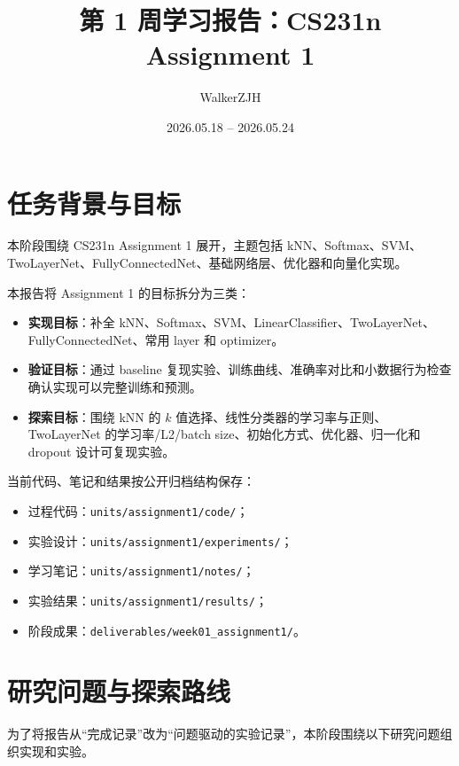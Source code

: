 \documentclass[UTF8]{ctexart}
\title{第 1 周学习报告：CS231n Assignment 1}
\author{WalkerZJH}
\date{2026.05.18 -- 2026.05.24}
\begin{document}
\maketitle

\section{任务背景与目标}

本阶段围绕 CS231n Assignment 1 展开，主题包括 kNN、Softmax、SVM、TwoLayerNet、FullyConnectedNet、基础网络层、优化器和向量化实现。

本报告将 Assignment 1 的目标拆分为三类：
\begin{itemize}
  \item \textbf{实现目标}：补全 kNN、Softmax、SVM、LinearClassifier、TwoLayerNet、FullyConnectedNet、常用 layer 和 optimizer。
  \item \textbf{验证目标}：通过 baseline 复现实验、训练曲线、准确率对比和小数据行为检查确认实现可以完整训练和预测。
  \item \textbf{探索目标}：围绕 kNN 的 $k$ 值选择、线性分类器的学习率与正则、TwoLayerNet 的学习率/L2/batch size、初始化方式、优化器、归一化和 dropout 设计可复现实验。
\end{itemize}

当前代码、笔记和结果按公开归档结构保存：
\begin{itemize}
  \item 过程代码：\texttt{units/assignment1/code/}；
  \item 实验设计：\texttt{units/assignment1/experiments/}；
  \item 学习笔记：\texttt{units/assignment1/notes/}；
  \item 实验结果：\texttt{units/assignment1/results/}；
  \item 阶段成果：\texttt{deliverables/week01\_assignment1/}。
\end{itemize}

\section{研究问题与探索路线}

为了将报告从“完成记录”改为“问题驱动的实验记录”，本阶段围绕以下研究问题组织实现和实验。
\end{document}
